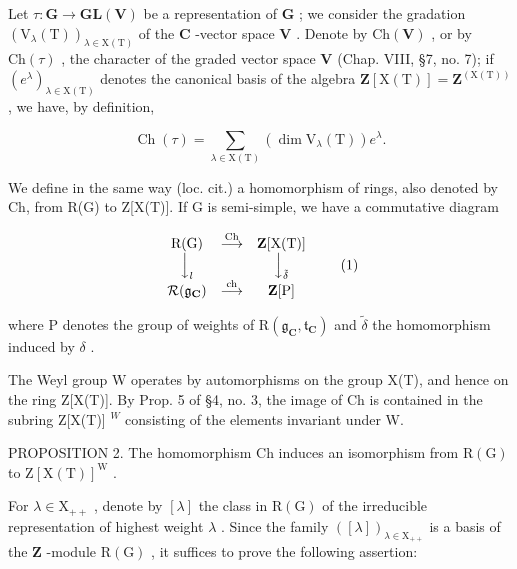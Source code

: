 Let \(\tau : \mathbf{G} \to \mathbf{GL}(\mathbf{V})\) be a representation of \(\mathbf{G}\) ; we consider the gradation \((\mathrm{V}_{\lambda}(\mathrm{T}))_{\lambda \in \mathrm{X}(\mathrm{T})}\) of the \(\mathbf{C}\) -vector space \(\mathbf{V}\) . Denote by \(\mathrm{Ch}(\mathbf{V})\) , or by \(\mathrm{Ch}(\tau)\) , the character of the graded vector space \(\mathbf{V}\) (Chap. VIII, §7, no. 7); if \((e^{\lambda})_{\lambda \in \mathrm{X}(\mathrm{T})}\) denotes the canonical basis of the algebra \(\mathbf{Z}[\mathrm{X}(\mathrm{T})] = \mathbf{Z}^{(\mathrm{X}(\mathrm{T}))}\) , we have, by definition,

\[
\operatorname{Ch} (\tau) = \sum_ {\lambda \in \mathrm{X} (\mathrm{T})} \left(\dim \mathrm{V} _ {\lambda} (\mathrm{T})\right) e ^ {\lambda}.
\]

We define in the same way (loc. cit.) a homomorphism of rings, also denoted by Ch, from R(G) to Z[X(T)]. If G is semi-simple, we have a commutative diagram

\[
\begin{array}{c c c} \mathrm{R(G)} & \stackrel {{\mathrm{Ch}}} {{\longrightarrow}} & \mathbf {Z} [ \mathrm{X(T)} ] \\ \Big \downarrow_ {l} & & \Big \downarrow_ {\tilde {\delta}} \\ \mathcal {R} (\mathfrak {g} _ {\mathbf {C}}) & \stackrel {{\mathrm{ch}}} {{\longrightarrow}} & \mathbf {Z} [ \mathrm{P} ] \end{array}\tag{1}
\]

where P denotes the group of weights of \(\mathrm{R}(\mathfrak{g}_{\mathbf{C}}, \mathfrak{t}_{\mathbf{C}})\) and \(\tilde{\delta}\) the homomorphism induced by \(\delta\) .

The Weyl group W operates by automorphisms on the group X(T), and hence on the ring Z[X(T)]. By Prop. 5 of §4, no. 3, the image of Ch is contained in the subring Z[X(T)] \(^{W}\) consisting of the elements invariant under W.

PROPOSITION 2. The homomorphism \(\mathrm{Ch}\) induces an isomorphism from \(\mathrm{R}(\mathrm{G})\) to \(\mathrm{Z}[\mathrm{X}(\mathrm{T})]^{\mathrm{W}}\) .

For \(\lambda \in \mathrm{X}_{++}\) , denote by \([\lambda]\) the class in \(\mathrm{R}(\mathrm{G})\) of the irreducible representation of highest weight \(\lambda\) . Since the family \(([\lambda])_{\lambda \in \mathrm{X}_{++}}\) is a basis of the \(\mathbf{Z}\) -module \(\mathrm{R}(\mathrm{G})\) , it suffices to prove the following assertion:

